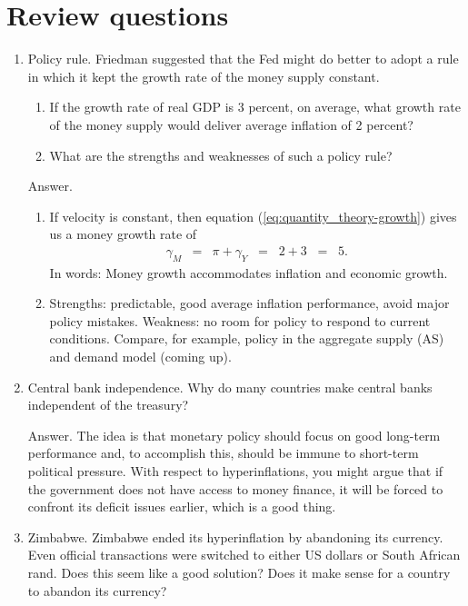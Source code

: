 \section*{Review questions}

\begin{enumerate}
\item Policy rule.  Friedman suggested that the Fed might do better to adopt
a rule in which it kept the growth rate of the money supply constant.
\begin{enumerate}
\item If the growth rate of real GDP is 3 percent, on average,
what growth rate of the money supply would deliver
average inflation of 2 percent?
\item What are the strengths and weaknesses of such a policy rule?
\end{enumerate}

Answer.
\begin{enumerate}
\item If velocity is constant, then
equation (\ref{eq:quantity_theory-growth}) gives us
a money growth rate of
\begin{eqnarray*}
    \gamma_M &=& \pi + \gamma_Y
            \;\;=\;\;  2 + 3 \;\;=\;\; 5.
\end{eqnarray*}
In words: Money growth accommodates inflation and economic growth.
\item Strengths: predictable, good average inflation performance,
avoid major policy mistakes.
Weakness: no room for policy to respond to current conditions.
Compare, for example, policy in the aggregate supply (AS) 
 and demand model
(coming up).
\end{enumerate}


\item Central bank independence.
Why do many countries make central banks  independent of the treasury?

Answer.  The idea is that monetary policy should focus on good long-term
performance and, to accomplish this, should be immune to
short-term political pressure.
With respect to hyperinflations,
you might argue that if the government does not have access to money finance,
it will be forced to confront its deficit issues earlier,
which is a good thing.



\item Zimbabwe.
Zimbabwe ended its hyperinflation by abandoning its currency.
Even official transactions were switched to either US dollars or
    South African rand.
    Does this seem like a good solution?
    Does it make sense for a country to abandon its currency?


\end{enumerate}
